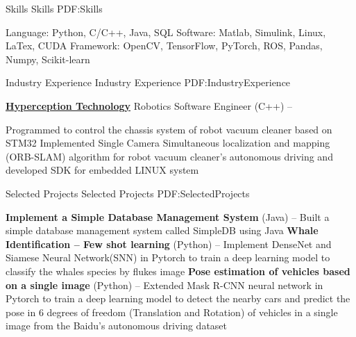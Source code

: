 \documentclass[letterpaper,MMMyyyy,nonstopmode]{simpleresumecv}
\begin{document}
\begin{Body}


\Section
{Skills}
{Skills}
{PDF:Skills}

\Entryhttps
\BulletItem
Language: Python, C/C++, Java, SQL
\BulletItem
Software: Matlab, Simulink, Linux, LaTex, CUDA
\BulletItem
Framework: OpenCV, TensorFlow, PyTorch, ROS, Pandas, Numpy, Scikit-learn


\Section
{Industry Experience}
{Industry Experience}
{PDF:IndustryExperience}

\Entry
\href{http://www.hyperci.com/}
{\textbf{Hyperception Technology}}
Robotics Software Engineer (C++)
\hfill
{} --
\Gap

\BulletItem
Programmed to control the chassis system of robot vacuum cleaner based on STM32
\BulletItem
Implemented Single Camera Simultaneous localization and mapping (ORB-SLAM) algorithm for robot vacuum cleaner's autonomous driving and developed SDK for embedded LINUX system


\Section
{Selected Projects}
{Selected Projects}
{PDF:SelectedProjects}

\Entry
{\textbf{Implement a Simple Database Management System}} (Java)
\hfill
{} --
\Gap
\BulletItem
Built a simple database management system called SimpleDB using Java
\Gap
{\textbf{Whale Identification – Few shot learning}} (Python)
\hfill
{} --
\Gap
\BulletItem
Implement DenseNet and Siamese Neural Network(SNN) in Pytorch to train a deep learning model to classify the whales species by flukes image 
\Gap
\Entry
{\textbf{Pose estimation of vehicles based on a single image }} (Python)
\hfill
{} --
\Gap
\BulletItem
Extended Mask R-CNN neural network in Pytorch to train a deep learning model to detect the nearby cars and predict the pose in 6 degrees of freedom (Translation and Rotation) of vehicles in a single image from the Baidu's autonomous driving dataset
\Gap



\end{Body}
\end{document}
